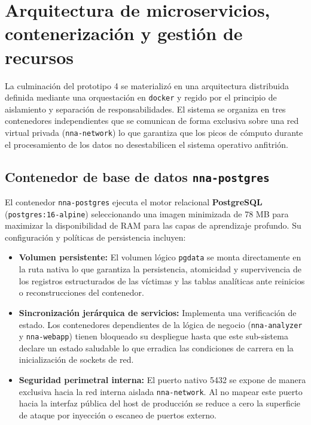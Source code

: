 \clearpage
\section{Arquitectura de microservicios, contenerización y gestión de recursos}
\label{sec:met_arquitectura_docker}

La culminación del prototipo 4 se materializó en una arquitectura distribuida definida mediante una orquestación en
\texttt{docker} y regido por el principio de aislamiento y separación de responsabilidades. El sistema
se organiza en tres contenedores independientes que se comunican de forma exclusiva sobre una red virtual
privada (\texttt{nna-network}) lo que garantiza que los picos de cómputo durante el procesamiento de los datos
no desestabilicen el sistema operativo anfitrión.

\subsection{Contenedor de base de datos \texttt{nna-postgres}}
\label{subsec:met_contenedor_postgres}

El contenedor \texttt{nna-postgres} ejecuta el motor relacional \textbf{PostgreSQL} (\texttt{postgres:16-alpine})
seleccionando una imagen minimizada de 78 MB para maximizar la disponibilidad de RAM para las capas de aprendizaje profundo.
Su configuración y políticas de persistencia incluyen:

\begin{itemize}
    \item \textbf{Volumen persistente:} El volumen lógico \texttt{pgdata} se monta directamente en la ruta nativa
    lo que garantiza la persistencia, atomicidad y supervivencia de los registros estructurados de las víctimas y
    las tablas analíticas ante reinicios o reconstrucciones del contenedor.
    \item \textbf{Sincronización jerárquica de servicios:} Implementa una verificación de estado. Los contenedores
    dependientes de la lógica de negocio (\texttt{nna-analyzer} y \texttt{nna-webapp}) tienen bloqueado su despliegue
    hasta que este sub-sistema declare un estado saludable lo que erradica las condiciones de carrera en la inicialización de sockets de red.
    \item \textbf{Seguridad perimetral interna:} El puerto nativo 5432 se expone de manera exclusiva hacia la red interna
    aislada \texttt{nna-network}. Al no mapear este puerto hacia la interfaz pública del host de producción se reduce a cero
    la superficie de ataque por inyección o escaneo de puertos externo.
\end{itemize}

